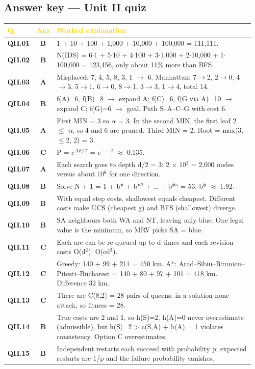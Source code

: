 \subsection*{Answer key --- Unit II quiz}
\begin{longtable}{>{\leavevmode\bfseries\color{navy}}p{1.3cm} c p{13.2cm}}
\rowcolor{navy}\textcolor{gold}{\textbf{Q.}}&\textcolor{gold}{\textbf{Ans}}&\textcolor{gold}{\textbf{Worked explanation}}\\\endhead
QII.01&\textbf{\color{leaf}B}&1 + 10 + 100 + 1,000 + 10,000 + 100,000 = 111,111.\\
\rowcolor{ivory}QII.02&\textbf{\color{leaf}B}&N(IDS) = 6$\cdot$1 + 5$\cdot$10 + 4$\cdot$100 + 3$\cdot$1,000 + 2$\cdot$10,000 + 1$\cdot$100,000 = 123,456, only about 11\% more than BFS.\\
QII.03&\textbf{\color{leaf}A}&Misplaced: 7, 4, 5, 8, 3, 1 $\to$ 6. Manhattan: 7$\to$2, 2$\to$0, 4$\to$3, 5$\to$1, 6$\to$0, 8$\to$1, 3$\to$3, 1$\to$4, total 14.\\
\rowcolor{ivory}QII.04&\textbf{\color{leaf}B}&f(A)=6, f(B)=8 $\to$ expand A; f(C)=6, f(G via A)=10 $\to$ expand C; f(G)=6 $\to$ goal. Path S--A--C--G with cost 6.\\
QII.05&\textbf{\color{leaf}A}&First MIN = 3 so $\alpha$ = 3. In the second MIN, the first leaf 2 $\le$ $\alpha$, so 4 and 6 are pruned. Third MIN = 2. Root = max(3, $\le$2, 2) = 3.\\
\rowcolor{ivory}QII.06&\textbf{\color{leaf}C}&P = $e^{\Delta E/T}$ = $e^{--2}$ $\approx$ 0.135.\\
QII.07&\textbf{\color{leaf}A}&Each search goes to depth d/2 = 3: 2 $\times$ 10$^3$ = 2,000 nodes versus about 10$^6$ for one direction.\\
\rowcolor{ivory}QII.08&\textbf{\color{leaf}B}&Solve N + 1 = 1 + b* + b*$^2$ + \dots{} + b*$^5$ = 53; b* $\approx$ 1.92.\\
QII.09&\textbf{\color{leaf}B}&With equal step costs, shallowest equals cheapest. Different costs make UCS (cheapest g) and BFS (shallowest) diverge.\\
\rowcolor{ivory}QII.10&\textbf{\color{leaf}B}&SA neighbours both WA and NT, leaving only blue. One legal value is the minimum, so MRV picks SA = blue.\\
QII.11&\textbf{\color{leaf}C}&Each arc can be re-queued up to d times and each revision costs O(d$^2$): O(cd$^3$).\\
\rowcolor{ivory}QII.12&\textbf{\color{leaf}C}&Greedy: 140 + 99 + 211 = 450 km. A*: Arad--Sibiu--Rimnicu--Pitesti--Bucharest = 140 + 80 + 97 + 101 = 418 km. Difference 32 km.\\
QII.13&\textbf{\color{leaf}C}&There are C(8,2) = 28 pairs of queens; in a solution none attack, so fitness = 28.\\
\rowcolor{ivory}QII.14&\textbf{\color{leaf}B}&True costs are 2 and 1, so h(S)=2, h(A)=0 never overestimate (admissible), but h(S)=2 > c(S,A) + h(A) = 1 violates consistency. Option C overestimates.\\
QII.15&\textbf{\color{leaf}B}&Independent restarts each succeed with probability p; expected restarts are 1/p and the failure probability vanishes.\\
\end{longtable}
